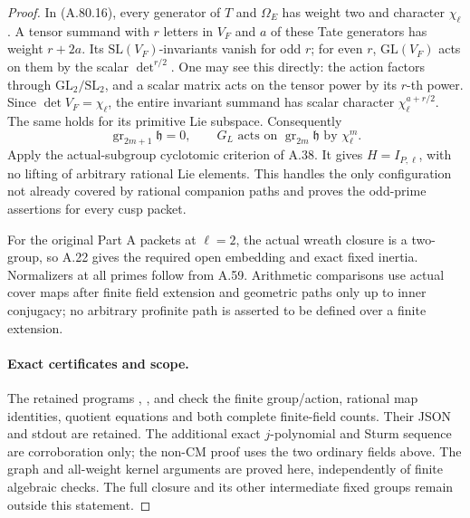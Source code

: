 \begin{proof}
In (A.80.16), every generator of \(T\) and \(\Omega_E\)
has weight two and character \(\chi_\ell\). A tensor
summand with \(r\) letters in \(V_F\) and \(a\) of
these Tate generators has weight \(r+2a\). Its
\(\mathrm{SL}(V_F)\)-invariants vanish for odd \(r\);
for even \(r\), \(\mathrm{GL}(V_F)\) acts on them
by the scalar \(\det^{r/2}\). One may see this directly:
the action factors through \(\mathrm{GL}_2/\mathrm{SL}_2\),
and a scalar matrix acts on the tensor power by its
\(r\)-th power. Since \(\det V_F=\chi_\ell\), the
entire invariant summand has scalar character
\(\chi_\ell^{a+r/2}\). The same holds for its primitive
Lie subspace. Consequently
\[
 \operatorname{gr}_{2m+1}\mathfrak h=0,\qquad
 G_L\text{ acts on }\operatorname{gr}_{2m}\mathfrak h
                           \text{ by }\chi_\ell^m.
                                                        \tag{A.80.18}
\]
Apply the actual-subgroup cyclotomic criterion of A.38.
It gives \(H=I_{P,\ell}\), with no lifting of arbitrary
rational Lie elements. This handles the only configuration
not already covered by rational companion paths and proves
the odd-prime assertions for every cusp packet.

For the original Part A packets at \(\ell=2\), the actual
wreath closure is a two-group, so A.22 gives the required
open embedding and exact fixed inertia. Normalizers at all
primes follow from A.59. Arithmetic comparisons use actual
cover maps after finite field extension and geometric paths
only up to inner conjugacy; no arbitrary profinite path is
asserted to be defined over a finite extension.

\paragraph{Exact certificates and scope.}
The retained programs
,
, and
check the finite group/action, rational map identities,
quotient equations and both complete finite-field counts.
Their JSON and stdout are retained. The additional exact
\(j\)-polynomial and Sturm sequence are corroboration only;
the non-CM proof uses the two ordinary fields above.
The graph and all-weight kernel arguments are proved here,
independently of finite algebraic checks. The full closure
and its other intermediate fixed groups remain outside
this statement.
\end{proof}
